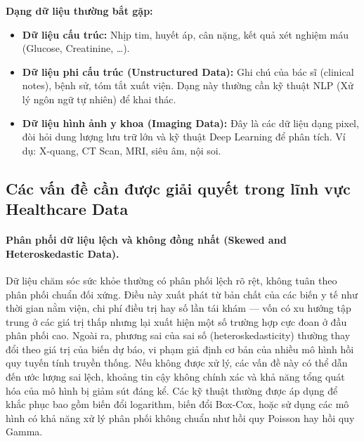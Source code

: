 \bigskip
\noindent\textbf{Dạng dữ liệu thường bắt gặp:}
 
\begin{itemize}[leftmargin=*, label={--}]
    \item \textbf{Dữ liệu cấu trúc:} Nhịp tim, huyết áp, cân nặng, kết quả xét nghiệm máu (Glucose, Creatinine, \ldots).
    \item \textbf{Dữ liệu phi cấu trúc (Unstructured Data):} Ghi chú của bác sĩ (clinical notes), bệnh sử, tóm tắt xuất viện. Dạng này thường cần kỹ thuật NLP (Xử lý ngôn ngữ tự nhiên) để khai thác.
    \item \textbf{Dữ liệu hình ảnh y khoa (Imaging Data):} Đây là các dữ liệu dạng pixel, đòi hỏi dung lượng lưu trữ lớn và kỹ thuật Deep Learning để phân tích. Ví dụ: X-quang, CT Scan, MRI, siêu âm, nội soi.
\end{itemize}
 
 
\subsection{Các vấn đề cần được giải quyết trong lĩnh vực Healthcare Data}
 
\paragraph{Phân phối dữ liệu lệch và không đồng nhất (Skewed and Heteroskedastic Data).}
Dữ liệu chăm sóc sức khỏe thường có phân phối lệch rõ rệt, không tuân theo phân phối chuẩn đối xứng. Điều này xuất phát từ bản chất của các biến y tế như thời gian nằm viện, chi phí điều trị hay số lần tái khám --- vốn có xu hướng tập trung ở các giá trị thấp nhưng lại xuất hiện một số trường hợp cực đoan ở đầu phân phối cao. Ngoài ra, phương sai của sai số (heteroskedasticity) thường thay đổi theo giá trị của biến dự báo, vi phạm giả định cơ bản của nhiều mô hình hồi quy tuyến tính truyền thống. Nếu không được xử lý, các vấn đề này có thể dẫn đến ước lượng sai lệch, khoảng tin cậy không chính xác và khả năng tổng quát hóa của mô hình bị giảm sút đáng kể. Các kỹ thuật thường được áp dụng để khắc phục bao gồm biến đổi logarithm, biến đổi Box-Cox, hoặc sử dụng các mô hình có khả năng xử lý phân phối không chuẩn như hồi quy Poisson hay hồi quy Gamma.
 
